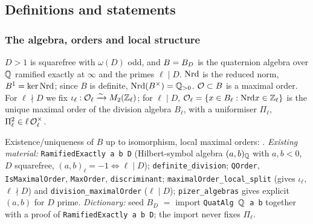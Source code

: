 \subsection{Definitions and statements}

\subsubsection{The algebra, orders and local structure}

\begin{definition}\label{def:s01-B}
$D>1$ is squarefree with $\omega(D)$ odd, and $B=B_D$ is the quaternion algebra over $\mathbb{Q}$ ramified exactly at $\infty$
and the primes $\ell\mid D$. $\mathrm{Nrd}$ is the reduced norm, $B^1=\ker\mathrm{Nrd}$; since $B$ is definite, $\mathrm{Nrd}(B^\times)=\mathbb{Q}_{>0}$.
$\mathcal{O}\subset B$ is a maximal order. For $\ell\nmid D$ we fix $\iota_\ell:\mathcal{O}_\ell\xrightarrow{\sim}M_2(\mathbb{Z}_\ell)$; for $\ell\mid D$,
$\mathcal{O}_\ell=\{x\in B_\ell:\mathrm{Nrd} x\in\mathbb{Z}_\ell\}$ is the unique maximal order of the division algebra $B_\ell$, with a
uniformiser $\Pi_\ell$, $\Pi_\ell^2\in\ell\,\mathcal{O}_\ell^\times$.
\end{definition}
\noindent\stknown{} Existence/uniqueness of $B$ up to isomorphism, local maximal orders:
.
\emph{Existing material:}  \texttt{RamifiedExactly a b D} (Hilbert-symbol algebra
$(a,b)_{\mathbb{Q}}$ with $a,b<0$, $D$ squarefree, $(a,b)_\ell=-1\iff\ell\mid D$);  \texttt{definite\_division};
 \texttt{QOrder}, \texttt{IsMaximalOrder}, \texttt{MaxOrder}, \texttt{discriminant};
 \texttt{maximalOrder\_local\_split} (gives $\iota_\ell$, $\ell\nmid D$) and
\texttt{division\_maximalOrder} ($\ell\mid D$); \texttt{pizer\_algebras} gives explicit $(a,b)$ for $D$ prime.
\emph{Dictionary:} seed $B_D$ $=$ import \texttt{QuatAlg $\mathbb{Q}$ a b} together with a proof of \texttt{RamifiedExactly a b D};
the import never fixes $\Pi_\ell$.


